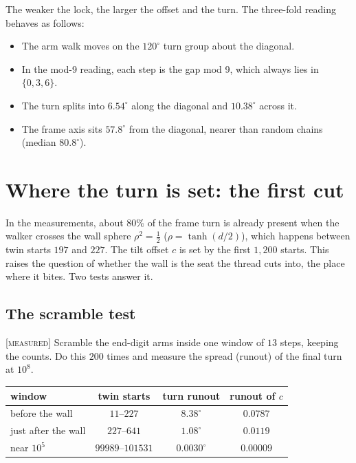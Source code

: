 \documentclass[11pt]{article}
\theoremstyle{definition}
\theoremstyle{remark}
\newcommand{\grade}[1]{\textsc{[#1]}}
\begin{document}
\noindent The weaker the lock, the larger the offset and the turn. The three-fold reading behaves as follows:
\begin{itemize}
\item The arm walk moves on the $120^\circ$ turn group about the diagonal.
\item In the mod-9 reading, each step is the gap mod 9, which always lies in $\{0,3,6\}$.
\item The turn splits into $6.54^\circ$ along the diagonal and $10.38^\circ$ across it.
\item The frame axis sits $57.8^\circ$ from the diagonal, nearer than random chains (median $80.8^\circ$).
\end{itemize}

\section{Where the turn is set: the first cut}\label{sec:firstcut}

In the measurements, about $80\%$ of the frame turn is already present when the walker crosses the wall sphere $\rho^2=\tfrac12$ ($\rho=\tanh(d/2)$), which happens between twin starts $197$ and $227$. The tilt offset $c$ is set by the first $1{,}200$ starts. This raises the question of whether the wall is the seat the thread cuts into, the place where it bites. Two tests answer it.

\subsection{The scramble test} \grade{measured}
Scramble the end-digit arms inside one window of $13$ steps, keeping the counts. Do this $200$ times and measure the spread (runout) of the final turn at $10^8$.

\begin{center}\begin{tabular}{lccc}
\toprule
window & twin starts & turn runout & runout of $c$\\
\midrule
before the wall & $11$--$227$ & $8.38^\circ$ & $0.0787$\\
just after the wall & $227$--$641$ & $1.08^\circ$ & $0.0119$\\
near $10^5$ & $99989$--$101531$ & $0.0030^\circ$ & $0.00009$\\
\bottomrule
\end{tabular}\end{center}
\end{document}
